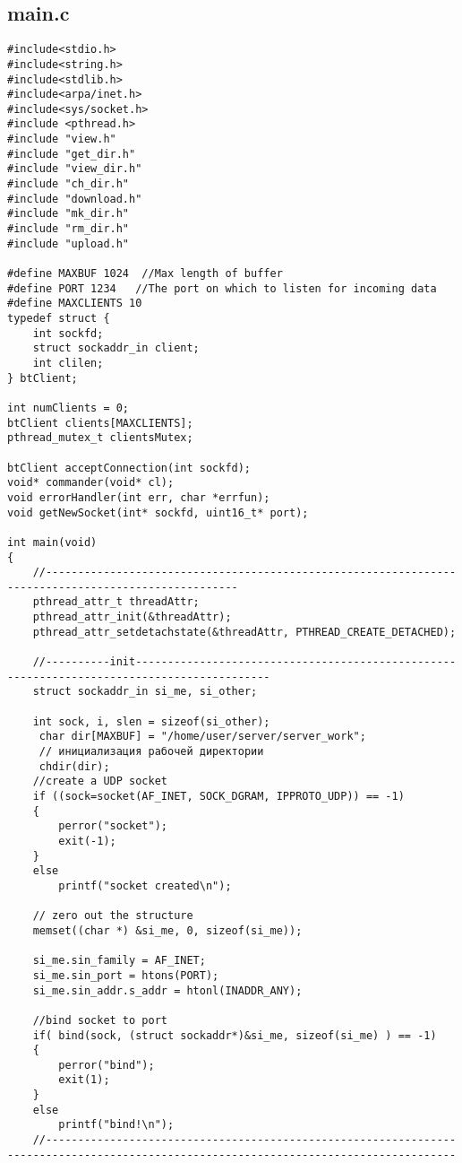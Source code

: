 \documentclass[12pt,a4paper]{report}
\begin{document}
\subsection*{main.c}
\begin{lstlisting}
#include<stdio.h>
#include<string.h>
#include<stdlib.h>
#include<arpa/inet.h>
#include<sys/socket.h>
#include <pthread.h>
#include "view.h"
#include "get_dir.h"
#include "view_dir.h"
#include "ch_dir.h"
#include "download.h"
#include "mk_dir.h"
#include "rm_dir.h"
#include "upload.h"

#define MAXBUF 1024  //Max length of buffer
#define PORT 1234   //The port on which to listen for incoming data
#define MAXCLIENTS 10
typedef struct {
    int sockfd;
    struct sockaddr_in client;
    int clilen;
} btClient;

int numClients = 0;
btClient clients[MAXCLIENTS];
pthread_mutex_t clientsMutex;

btClient acceptConnection(int sockfd);
void* commander(void* cl);
void errorHandler(int err, char *errfun);
void getNewSocket(int* sockfd, uint16_t* port);

int main(void)
{
    //----------------------------------------------------------------------------------------------------
    pthread_attr_t threadAttr;
    pthread_attr_init(&threadAttr);
    pthread_attr_setdetachstate(&threadAttr, PTHREAD_CREATE_DETACHED);

    //----------init-------------------------------------------------------------------------------------------
    struct sockaddr_in si_me, si_other;

    int sock, i, slen = sizeof(si_other);
     char dir[MAXBUF] = "/home/user/server/server_work";
     // инициализация рабочей директории
     chdir(dir);
    //create a UDP socket
    if ((sock=socket(AF_INET, SOCK_DGRAM, IPPROTO_UDP)) == -1)
    {
        perror("socket");
        exit(-1);
    }
    else
        printf("socket created\n");

    // zero out the structure
    memset((char *) &si_me, 0, sizeof(si_me));

    si_me.sin_family = AF_INET;
    si_me.sin_port = htons(PORT);
    si_me.sin_addr.s_addr = htonl(INADDR_ANY);

    //bind socket to port
    if( bind(sock, (struct sockaddr*)&si_me, sizeof(si_me) ) == -1)
    {
        perror("bind");
        exit(1);
    }
    else
        printf("bind!\n");
    //--------------------------------------------------------------------------------------------------------------------------------------


\end{lstlisting}
\end{document}
